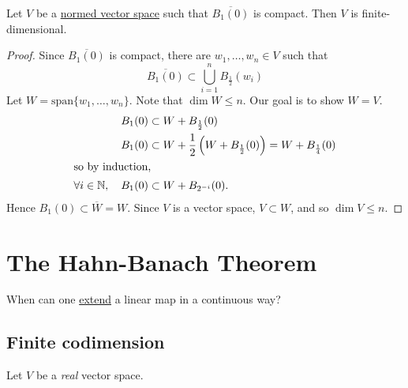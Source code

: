 \documentclass{article}
\newcommand{\K}{\mathbb{K}}
\begin{document}
\begin{thm}
    Let $V$ be a \hyperlink{def:nvs}{normed vector space} such that $\overline{B_1(0)}$ is compact. Then $V$ is finite-dimensional.
\end{thm}

\begin{proof}
    Since $\overline{B_1(0)}$ is compact, there are $w_1, \dotsc, w_n \in V$ such that
    \begin{equation*}
        \overline{B_1(0)} \subset \bigcup_{i=1}^n B_{\frac12} (w_i)
    \end{equation*}
    Let $W = \mathrm{span}\{w_1, \dotsc, w_n\}$. Note that $\dim W \leq n$. Our goal is to show $W = V$.
    \begin{align*}
        B_1(0) &\subset W + B_{\frac{1}{2}} (0) \\
        B_1(0) &\subset W + \frac{1}{2}\left(W + B_{\frac{1}{2}} (0)\right) = W + B_{\frac{1}{4}}(0) \\
        \shortintertext{so by induction,}
        \forall i \in \mathbb{N}, \quad B_1(0) & \subset W + B_{2^{-i}} (0).
    \end{align*}
    Hence $B_1(0) \subset \overline{W} = W$.
    Since $V$ is a vector space, $V \subset W$, and so $\dim V \leq n$.
\end{proof}

\clearpage


\section{The Hahn-Banach Theorem}


When can one \hyperlink{def:extend}{extend} a linear map in a continuous way?

\subsection{Finite codimension}

Let $V$ be a \emph{real} vector space.

\end{document}
